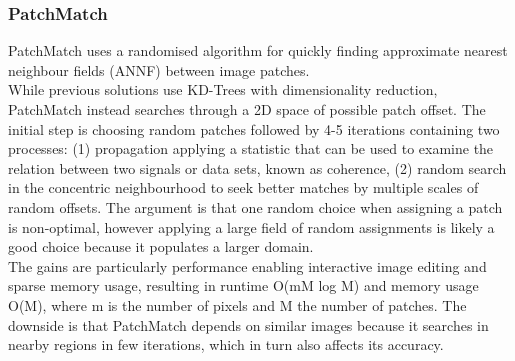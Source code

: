 \subsubsection{PatchMatch}
PatchMatch uses a randomised algorithm for quickly finding approximate nearest neighbour fields (ANNF) between image patches. 
\\[2mm]
While previous solutions use KD-Trees with dimensionality reduction, PatchMatch instead searches through a 2D space of possible patch offset. 
The initial step is choosing random patches followed by 4-5 iterations containing two processes: (1) propagation applying a statistic that can be used to examine the relation between two signals or data sets, known as coherence, (2) random search in the concentric neighbourhood to seek better matches by multiple scales of random offsets. The argument is that one random choice when assigning a patch is non-optimal, however applying a large field of random assignments is likely a good choice because it populates a larger domain. 
\\[2mm]
The gains are particularly performance enabling interactive image editing and sparse memory usage, resulting in runtime O(mM log M) and memory usage O(M), where m is the number of pixels and M the number of patches. The downside is that PatchMatch depends on similar images because it searches in nearby regions in few iterations, which in turn also affects its accuracy. 



